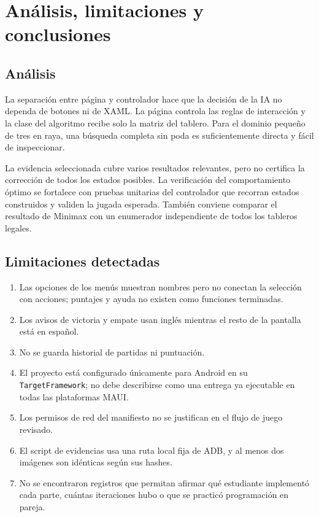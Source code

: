 \chapter{Análisis, limitaciones y conclusiones}
\section{Análisis}
La separación entre página y controlador hace que la decisión de la IA no dependa de botones ni de XAML. La página controla las reglas de interacción y la clase del algoritmo recibe solo la matriz del tablero. Para el dominio pequeño de tres en raya, una búsqueda completa sin poda es suficientemente directa y fácil de inspeccionar.

La evidencia seleccionada cubre varios resultados relevantes, pero no certifica la corrección de todos los estados posibles. La verificación del comportamiento óptimo se fortalece con pruebas unitarias del controlador que recorran estados construidos y validen la jugada esperada. También conviene comparar el resultado de Minimax con un enumerador independiente de todos los tableros legales.

\section{Limitaciones detectadas}
\begin{enumerate}
  \item Las opciones de los menús muestran nombres pero no conectan la selección con acciones; puntajes y ayuda no existen como funciones terminadas.
  \item Los avisos de victoria y empate usan inglés mientras el resto de la pantalla está en español.
  \item No se guarda historial de partidas ni puntuación.
  \item El proyecto está configurado únicamente para Android en su \texttt{TargetFramework}; no debe describirse como una entrega ya ejecutable en todas las plataformas MAUI.
  \item Los permisos de red del manifiesto no se justifican en el flujo de juego revisado.
  \item El script de evidencias usa una ruta local fija de ADB, y al menos dos imágenes son idénticas según sus hashes.
  \item No se encontraron registros que permitan afirmar qué estudiante implementó cada parte, cuántas iteraciones hubo o que se practicó programación en pareja.
\end{enumerate}

